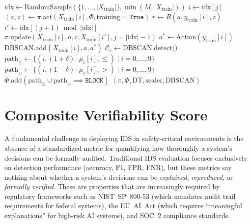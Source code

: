 \documentclass[12pt, letterpaper, oneside]{report}
\begin{document}
\begin{algorithm}[htbp]
\begin{algorithmic}[1]
\State {}
    \State $\text{idx} \leftarrow \text{RandomSample}(\{1,\ldots,|X_{\text{train}}|\}, \min(M, |X_{\text{train}}|))$
        \State $i \leftarrow \text{idx}[j]$
        \State $(a, z) \leftarrow \pi.\text{act}(X_{\text{train}}[i], \Phi, \text{training}=\texttt{True})$ 
        \State $r \leftarrow R(a, y_{\text{train}}[i], z)$ 
        \State $i' \leftarrow \text{idx}[(j+1) \bmod |\text{idx}|]$
        \State $\pi.\text{update}(X_{\text{train}}[i], a, r, X_{\text{train}}[i'], j = |\text{idx}|-1)$ 
        \State $a^* \leftarrow \text{Action}(y_{\text{train}}[i])$ 
        \State $\text{DBSCAN.add}(X_{\text{train}}[i], a, a^*)$
    \EndFor
     
        \State $\mathcal{C}_e \leftarrow \text{DBSCAN.detect()}$ 
            \State $\text{path}_{\leq} \leftarrow \{(i, (1+\delta) \cdot \mu_c[i], \leq) \mid i = 0,\ldots,9\}$
            \State $\text{path}_{>} \leftarrow \{(i, (1-\delta) \cdot \mu_c[i], >) \mid i = 0,\ldots,9\}$
            \State $\Phi.\text{add}(\text{path}_{\leq} \cup \text{path}_{>} \implies \texttt{BLOCK})$
        \EndFor
    \EndIf
\EndFor
\State \Return $(\pi, \Phi, \text{DT}, \text{scaler}, \text{DBSCAN})$
\end{algorithmic}
\end{algorithm}


\section{Composite Verifiability Score}
\label{sec:cvs}

A fundamental challenge in deploying IDS in safety-critical environments is the absence of a standardized metric for quantifying how thoroughly a system's decisions can be formally audited. Traditional IDS evaluation focuses exclusively on detection performance (accuracy, F1, FPR, FNR), but these metrics say nothing about whether a system's decisions can be \emph{explained}, \emph{reproduced}, or \emph{formally verified}. These are properties that are increasingly required by regulatory frameworks such as NIST~SP~800-53 (which mandates audit trail requirements for federal systems), the EU~AI~Act (which requires ``meaningful explanations'' for high-risk AI systems), and SOC~2 compliance standards.
\end{document}
